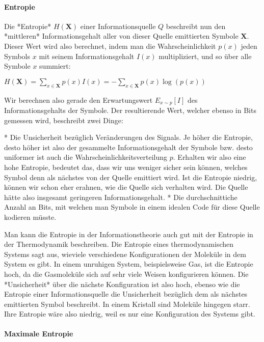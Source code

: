 \paragraph{ Entropie}

Die *Entropie* $H(\mathbf{X})$ einer Informationsquelle $Q$ beschreibt nun den
*mittleren* Informationsgehalt aller von dieser Quelle emittierten Symbole
$\mathbf{X}$. Dieser Wert wird also berechnet, indem man die Wahrscheinlichkeit
$p(x)$ jeden Symbols $x$ mit seinem Informationsgehalt $I(x)$ multipliziert, und
so über alle Symbole $x$ summiert:

$H(\mathbf{X}) = \sum_{x \in \mathbf{X}} p(x)I(x) = -\sum_{x \in \mathbf{X}}
p(x)\log(p(x))$

Wir berechnen also gerade den Erwartungswert $E_{x \sim p}[I]$ des
Informationsgehalts der Symbole. Der resultierende Wert, welcher ebenso in Bits
gemessen wird, beschreibt zwei Dinge:

* Die Unsicherheit bezüglich Veränderungen des Signals. Je höher die Entropie,
  desto höher ist also der gesammelte Informationsgehalt der Symbole bzw. desto
  uniformer ist auch die Wahrscheinlichkeitsverteilung $p$. Erhalten wir also
  eine hohe Entropie, bedeutet das, dass wir uns weniger sicher sein können,
  welches Symbol denn als nächstes von der Quelle emittiert wird. Ist die
  Entropie niedrig, können wir schon eher erahnen, wie die Quelle sich verhalten
  wird. Die Quelle hätte also insgesamt geringeren Informationsgehalt.
* Die durchschnittiche Anzahl an Bits, mit welchen man Symbole in einem idealen
  Code für diese Quelle kodieren müsste.

Man kann die Entropie in der Informationstheorie auch gut mit der Entropie in
der Thermodynamik beschreiben. Die Entropie eines thermodynamischen Systems
sagt aus, wieviele verschiedene Konfigurationen der Moleküle in dem System es
gibt. In einem unruhigen System, beispielsweise Gas, ist die Entropie hoch, da
die Gasmoleküle sich auf sehr viele Weisen konfigurieren können. Die
*Unsicherheit* über die nächste Konfiguration ist also hoch, ebenso wie die
Entropie einer Informationsquelle die Unsicherheit bezüglich dem als nächstes
emittierten Symbol beschreibt. In einem Kristall sind Moleküle hingegen starr.
Ihre Entropie wäre also niedrig, weil es nur eine Konfiguration des Systems
gibt.

\paragraph{ Maximale Entropie}

